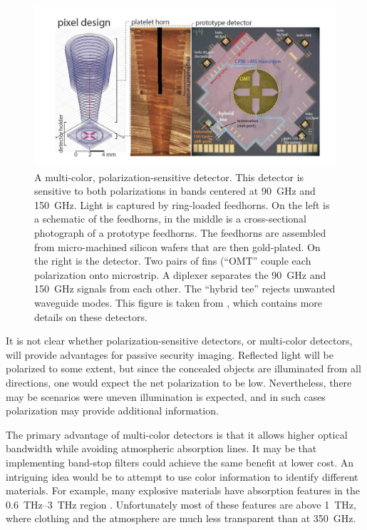 \begin{figure}
\centering
\includegraphics[width=\textwidth]{images/ch9-multi-chroic.jpg}
\caption[Multi-color, polarization-sensitive detectors]{
  A multi-color, polarization-sensitive detector.
  This detector is sensitive to both polarizations in bands centered at \SI{90}{\GHz} and \SI{150}{\GHz}.
  Light is captured by ring-loaded feedhorns.
  On the left is a schematic of the feedhorns, in the middle is a cross-sectional photograph of a prototype feedhorns.
  The feedhorns are assembled from micro-machined silicon wafers that are then gold-plated.
  On the right is the detector.
  Two pairs of fins (``OMT'' couple each polarization onto microstrip.
  A diplexer separates the \SI{90}{\GHz} and \SI{150}{\GHz} signals from each other.
  The ``hybrid tee'' rejects unwanted waveguide modes.
  This figure is taken from \cite{datta_horn_2014}, which contains more details on these detectors.
}
\label{fig:ch9-multi-chroic}
\end{figure}

It is not clear whether polarization-sensitive detectors, or multi-color detectors, will provide advantages for passive security imaging.
Reflected light will be polarized to some extent, but since the concealed objects are illuminated from all directions, one would expect the net polarization to be low.
Nevertheless, there may be scenarios were uneven illumination is expected, and in such cases polarization may provide additional information.

The primary advantage of multi-color detectors is that it allows higher optical bandwidth while avoiding atmospheric absorption lines.
It may be that implementing band-stop filters could achieve the same benefit at lower cost.
An intriguing idea would be to attempt to use color information to identify different materials.
For example, many explosive materials have absorption features in the \SIrange{0.6}{3}{\THz} region \cite{federici_thz_2005,davies_terahertz_2008}.
Unfortunately most of these features are above \SI{1}{\THz}, where clothing and the atmosphere are much less transparent than at \SI{350}{\GHz}.

